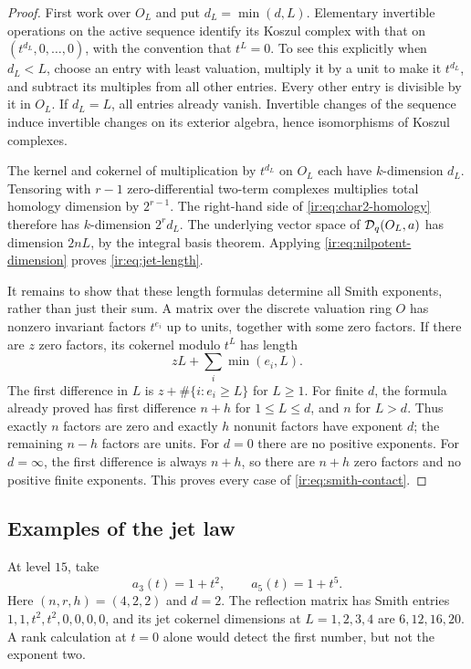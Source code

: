 \begin{proof}
First work over $O_L$ and put $d_L=\min(d,L)$. Elementary invertible
operations on the active sequence identify its Koszul complex with
that on $(t^{d_L},0,\ldots,0)$, with the convention that $t^L=0$.
To see this explicitly when $d_L<L$, choose an entry with least
valuation, multiply it by a unit to make it $t^{d_L}$, and subtract
its multiples from all other entries. Every other entry is divisible
by it in $O_L$. If $d_L=L$, all entries already vanish. Invertible
changes of the sequence induce invertible changes on its exterior
algebra, hence isomorphisms of Koszul complexes.

The kernel and cokernel of multiplication by $t^{d_L}$ on $O_L$
each have $k$-dimension $d_L$. Tensoring with $r-1$ zero-differential
two-term complexes multiplies total homology dimension by $2^{r-1}$.
The right-hand side of \eqref{ir:eq:char2-homology} therefore has
$k$-dimension $2^r d_L$. The underlying vector space of
$\mathcal D_q(O_L,a)$ has dimension $2nL$, by the integral basis theorem.
Applying \eqref{ir:eq:nilpotent-dimension} proves
\eqref{ir:eq:jet-length}.

It remains to show that these length formulas determine all Smith
exponents, rather than just their sum. A matrix over the discrete
valuation ring $O$ has nonzero invariant factors $t^{e_i}$ up to
units, together with some zero factors. If there are $z$ zero
factors, its cokernel modulo $t^L$ has length
\[
 zL+\sum_i\min(e_i,L).
\]
The first difference in $L$ is $z+\#\{i:e_i\ge L\}$ for $L\ge1$.
For finite $d$, the formula already proved has first difference
$n+h$ for $1\le L\le d$, and $n$ for $L>d$. Thus exactly $n$
factors are zero and exactly $h$ nonunit factors have exponent $d$;
the remaining $n-h$ factors are units. For $d=0$ there are no
positive exponents. For $d=\infty$, the first difference is always
$n+h$, so there are $n+h$ zero factors and no positive finite
exponents. This proves every case of \eqref{ir:eq:smith-contact}.
\end{proof}

\subsection{Examples of the jet law}
At level $15$, take
\[
 a_3(t)=1+t^2,\qquad a_5(t)=1+t^5.
\]
Here $(n,r,h)=(4,2,2)$ and $d=2$. The reflection matrix has Smith
entries $1,1,t^2,t^2,0,0,0,0$, and its jet cokernel dimensions at
$L=1,2,3,4$ are $6,12,16,20$. A rank calculation at $t=0$ alone
would detect the first number, but not the exponent two.

